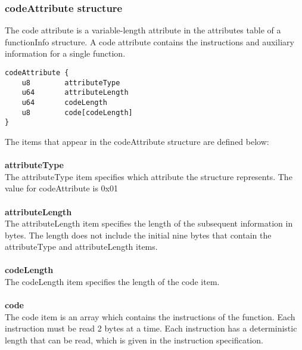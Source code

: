 \documentclass[12pt]{article}
\newcommand*{\formalfont}{\fontfamily{ptm}\selectfont}
\newcommand\tab[1][1cm]{\hspace*{#1}}
\begin{document}
			\subsubsection{codeAttribute structure}
				The code attribute is a variable-length attribute in the attributes table of a functionInfo structure. A code attribute contains the instructions and auxiliary information for a single function.
			\begin{Verbatim}[frame=single]
codeAttribute {	
	u8        attributeType
	u64       attributeLength
	u64       codeLength
	u8        code[codeLength]
}
			\end{Verbatim}
			The items that appear in the {\formalfont codeAttribute} structure are defined below: \\ \\
			\textbf{attributeType} \\
				\tab The {\formalfont attributeType} item specifies which attribute the structure represents. The value for {\formalfont codeAttribute} is \colorbox{code}{0x01} \\ \\
			\textbf{attributeLength} \\
				\tab The {\formalfont attributeLength} item specifies the length of the subsequent information in bytes. The length does not include the initial nine bytes that contain the attributeType and attributeLength items. \\ \\
			\textbf{codeLength} \\
				\tab The {\formalfont codeLength} item specifies the length of the {\formalfont code} item. \\ \\
			\textbf{code} \\
				\tab The {\formalfont code} item is an array which contains the instructions of the function. Each instruction must be read 2 bytes at a time. Each instruction has a deterministic length that can be read, which is given in the instruction specification. 
						
	
\end{document}
